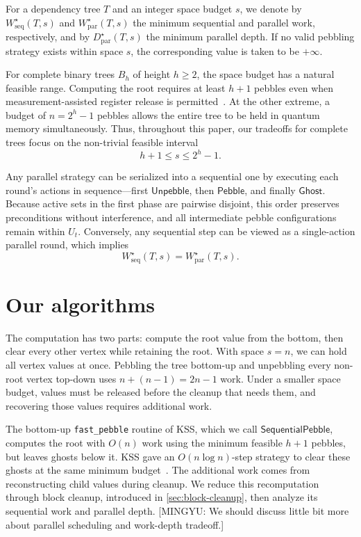 \documentclass[11pt]{article}
\theoremstyle{definition}
\theoremstyle{remark}
\newcommand{\Peb}{\mathsf{Pebble}}
\newcommand{\Unp}{\mathsf{Unpebble}}
\newcommand{\Ghost}{\mathsf{Ghost}}
\newcommand{\Fast}{\mathsf{SequentialPebble}}
\newcommand{\Wseq}{W_{\mathrm{seq}}}
\newcommand{\Wpar}{W_{\mathrm{par}}}
\newcommand{\Dpar}{D_{\mathrm{par}}}
\newcommand{\mingyu}[1]{{\color{magenta}\footnotesize [MINGYU: #1]}} %
\begin{document}
For a dependency tree $T$ and an integer space budget $s$, we denote by $\Wseq^\star(T,s)$ and $\Wpar^\star(T,s)$ the minimum sequential and parallel work, respectively, and by $\Dpar^\star(T,s)$ the minimum parallel depth. If no valid pebbling strategy exists within space $s$, the corresponding value is taken to be $+\infty$.

For complete binary trees $B_h$ of height $h \ge 2$, the space budget has a natural feasible range. Computing the root requires at least $h+1$ pebbles even when measurement-assisted register release is permitted~\cite{Cook1973,KSS2025}. At the other extreme, a budget of $n = 2^h-1$ pebbles allows the entire tree to be held in quantum memory simultaneously. Thus, throughout this paper, our tradeoffs for complete trees focus on the non-trivial feasible interval
\begin{equation}
    h+1 \le s \le 2^h-1.
\end{equation}

Any parallel strategy can be serialized into a sequential one by executing each round's actions in sequence—first $\Unp$, then $\Peb$, and finally $\Ghost$. Because active sets in the first phase are pairwise disjoint, this order preserves preconditions without interference, and all intermediate pebble configurations remain within $U_t$. Conversely, any sequential step can be viewed as a single-action parallel round, which implies
\begin{equation}
    \Wseq^\star(T,s) = \Wpar^\star(T,s).
    \label{eq:serialize}
\end{equation}



\section{Our algorithms}
\label{sec:main-algorithms}

The computation has two parts: compute the root value from the bottom, then clear every other vertex while retaining the root. With space $s=n$, we can hold all vertex values at once. Pebbling the tree bottom-up and unpebbling every non-root vertex top-down uses $n+(n-1)=2n-1$ work. Under a smaller space budget, values must be released before the cleanup that needs them, and recovering those values requires additional work.

The bottom-up \texttt{fast\_pebble} routine of KSS, which we call $\Fast$, computes the root with $O(n)$ work using the minimum feasible $h+1$ pebbles, but leaves ghosts below it. KSS gave an $O(n\log n)$-step strategy to clear these ghosts at the same minimum budget~\cite[Theorem~5.5]{KSS2025}. The additional work comes from reconstructing child values during cleanup. We reduce this recomputation through block cleanup, introduced in \cref{sec:block-cleanup}, then analyze its sequential work and parallel depth. \mingyu{We should discuss little bit more about parallel scheduling and work-depth tradeoff.}
\end{document}
